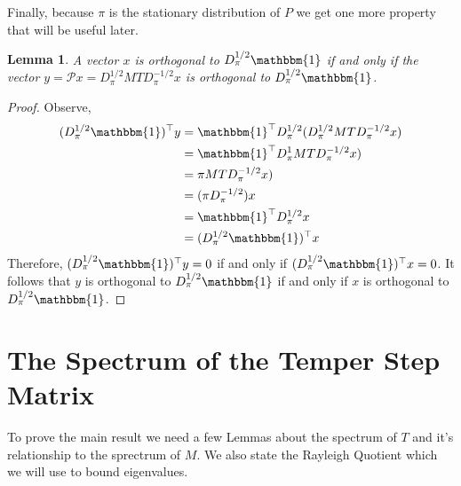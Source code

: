\documentclass{amsart}
\newtheorem{lemma}[definition]{Lemma}
\newcommand{\1}{\mathbbm{1}}
\newcommand{\D}{D_\pi^{1/2}}
\newcommand{\Dm}{D_\pi^{-1/2}}
\begin{document}
Finally, because $\pi$ is the stationary distribution of $P$ we get one more property that will be useful later.
\begin{lemma}
    A vector $x$ is orthogonal to $\D\1$ if and only if the vector $y=\mathcal{P}x=\D MT\Dm x$ is orthogonal to $\D\1$.
\end{lemma}
\begin{proof}
    Observe,
    \begin{align*}
        (\D\1)^\top y&=\1^\top \D (\D MT\Dm x)\\
        &=\1^\top D^1_\pi MT\Dm x)\\
        &=\pi MT\Dm x)\\
        &=(\pi \Dm)x\\
        &=\1^\top \D x\\
        &=(\D\1)^\top x
    \end{align*}
    Therefore, $(\D\1)^\top y=0$ if and only if $(\D\1)^\top x=0$. It follows that $y$ is orthogonal to $\D\1$ if and only if $x$ is orthogonal to $\D\1$.
\end{proof}

\section{The Spectrum of the Temper Step Matrix}
To prove the main result we need a few Lemmas about the spectrum of $T$ and it's relationship to the sprectrum of $M$. We also state the Rayleigh Quotient which we will use to bound eigenvalues. 
\end{document}
